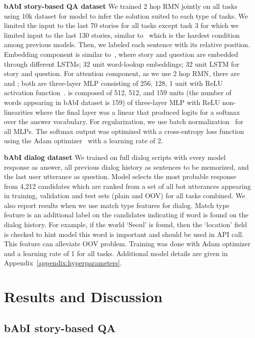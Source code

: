 \documentclass{article} \usepackage{iclr2018_conference,times}
\begin{document}
\textbf{bAbI story-based QA dataset} \quad 
We trained 2 hop RMN jointly on all tasks using 10k dataset for model to infer the solution suited to each type of tasks.  
We limited the input to the last 70 stories for all tasks except task 3 for which we limited input to the last 130 stories, similar to~\citet{xiong2016dynamic} which is the hardest condition among previous models.
Then, we labeled each sentence with its relative position. 
Embedding component is similar to~\citet{santoro2017simple}, where story and question are embedded through different LSTMs; 32 unit word-lookup embeddings; 32 unit LSTM for story and question.
For attention component, as we use 2 hop RMN, there are  and ; both are three-layer MLP consisting of 256, 128, 1 unit with ReLU activation function~\citep{nair2010rectified}.
 is composed of 512, 512, and 159 units (the number of words appearing in bAbI dataset is 159) of three-layer MLP with ReLU non-linearities where the final layer was a linear that produced logits for a softmax over the answer vocabulary. 
For regularization, we use batch normalization~\citep{ioffe2015batch} for all MLPs. 
The softmax output was optimized with a cross-entropy loss function using the Adam optimizer~\citep{kingma2014adam} with a learning rate of 2.


\textbf{bAbI dialog dataset} \quad 
We trained on full dialog scripts with every model response as answer, all previous dialog history as sentences to be memorized, and the last user utterance as question. 
Model selects the most probable response from 4,212 candidates which are ranked from a set of all bot utterances appearing in training, validation and test sets (plain and OOV) for all tasks combined. 
We also report results when we use match type features for dialog. 
Match type feature is an additional label on the candidates indicating if word is found on the dialog history.
For example, if the world `Seoul' is found, then the `location' field is checked to hint model this word is important and should be used in API call.
This feature can alleviate OOV problem. 
Training was done with Adam optimizer and a learning rate of 1 for all tasks.
Additional model details are given in Appendix~\ref{appendix:hyperparameters}.




\section{Results and Discussion}

\subsection{bAbI story-based QA}
\end{document}
